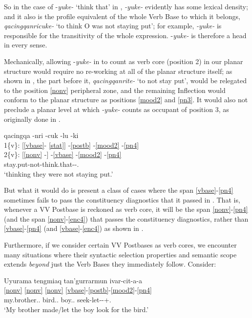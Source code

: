 \documentclass[output=paper]{langscibook}
\begin{document}
So in the case of -\textit{yuke-} `think that' in , \textit{{}-yuke-} evidently has some lexical density; and it also is the profile equivalent of the whole Verb Base to which it belongs, \textit{qacingqanricuke-} `to think O was not staying put'; for example, \textit{{}-yuke-} is responsible for the transitivity of the whole expression. -\textit{yuke-} is therefore a head in every sense.

Mechanically, allowing -\textit{yuke-} in  to count as verb core (position 2) in our planar structure would require no re-working at all of the planar structure itself; as shown in , the part before it, \textit{qacingqanrite-} `to not stay put', would be relegated to the position \ref{nonv} peripheral zone, and the remaining Inflection would conform to the planar structure as positions \ref{mood2} and \ref{pn3}. It would also not preclude a planar level at which \textit{{}-yuke-} counts as occupant of position 3, as originally done in .

\ea\label{ex:key:53} 
\gllll {} qacingqa -nri -cuk -lu -ki\\
    1\{v\}: [\ref{vbase}- \ref{stat}] -\ref{postb} -\ref{mood2} -\ref{pn4} \\
    2\{v\}: [\ref{nonv} -] -\ref{vbase} -\ref{mood2} -\ref{pn4} \\
     stay.put-not-think.that-\Appos-\Tpl.\Obj{}\\
\glt `thinking they were not staying put.'
\z

But what it would do is present a class of cases where the span \ref{vbase}-\ref{pn4} sometimes fails to pass the constituency diagnostics that it passed in . That is, whenever a VV Postbase is reckoned as verb core, it will be the span \ref{nonv}-\ref{pn4} (and the span \ref{nonv}-\ref{enc4}) that passes the constituency diagnostics, rather than \ref{vbase}-\ref{pn4} (and \ref{vbase}-\ref{enc4}) as shown in .

Furthermore, if we consider certain VV Postbases as verb cores, we encounter many situations where their syntactic selection properties and semantic scope extends \textit{beyond} just the Verb Bases they immediately follow. Consider:

\ea\label{ex:key:54} 
\glll Uyurama tengmiaq tan'gurrarmun ivar-cit-a-a\\
     \ref{nonv} \ref{nonv} \ref{nonv} \ref{vbase}-\ref{postb}-\ref{mood2}-\ref{pn4} \\
     my.brother.\Relc.\Sg{} bird.\Abs.\Sg{} boy.\Dat{}.\Sg{} seek-let-\Ind{}-\Third\Sg\Aarg{}+\Third\Sg.\Obj{}\\
\glt `My brother made/let the boy look for the bird.' \citep[274]{Woodbury1985}
\z
\end{document}
